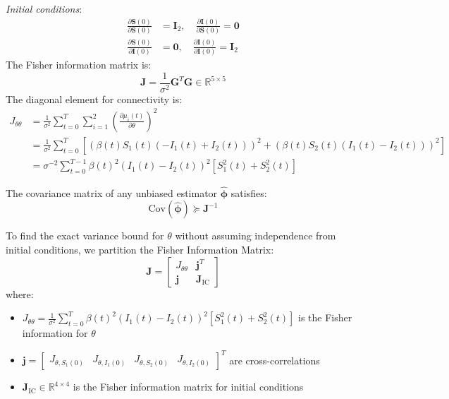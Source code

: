 \emph{Initial conditions}:
\begin{align}
\frac{\partial \mathbf{S}(0)}{\partial \mathbf{S}(0)} &= \mathbf{I}_2, \quad \frac{\partial \mathbf{I}(0)}{\partial \mathbf{S}(0)} = \mathbf{0} \\
\frac{\partial \mathbf{S}(0)}{\partial \mathbf{I}(0)} &= \mathbf{0}, \quad \frac{\partial \mathbf{I}(0)}{\partial \mathbf{I}(0)} = \mathbf{I}_2
\end{align}
The Fisher information matrix is:
\begin{equation}
\mathbf{J} = \frac{1}{\sigma^2} \mathbf{G}^T \mathbf{G} \in \mathbb{R}^{5 \times 5}
\end{equation}
The diagonal element for connectivity is:
\begin{align}
J_{\theta\theta} &= \frac{1}{\sigma^2} \sum_{t=0}^T \sum_{i=1}^2 \left(\frac{\partial \mu_i(t)}{\partial \theta}\right)^2 \\
&= \frac{1}{\sigma^2} \sum_{t=0}^T \left[ (\beta(t) S_1(t) (-I_1(t) + I_2(t)))^2 + (\beta(t) S_2(t) (I_1(t) - I_2(t)))^2 \right] \\
&= \sigma^{-2} \sum_{t=0}^{T-1} \beta(t)^2 (I_1(t) - I_2(t))^2 \left[ S_1^2(t) + S_2^2(t) \right]
\end{align}

The covariance matrix of any unbiased estimator $\hat{\boldsymbol{\phi}}$ satisfies:
\begin{equation}
\text{Cov}(\hat{\boldsymbol{\phi}}) \succeq \mathbf{J}^{-1}
\end{equation}

To find the exact variance bound for $\theta$ without assuming independence from initial conditions, we partition the Fisher Information Matrix:
\begin{equation}
\mathbf{J} = \begin{bmatrix}
J_{\theta\theta} & \mathbf{j}^T \\
\mathbf{j} & \mathbf{J}_{\text{IC}}
\end{bmatrix}
\end{equation}
where:
\begin{itemize}
\item $J_{\theta\theta} = \frac{1}{\sigma^2} \sum_{t=0}^T \beta(t)^2 (I_1(t) - I_2(t))^2 [ S_1^2(t) + S_2^2(t) ]$ is the Fisher information for $\theta$
\item $\mathbf{j} = \begin{bmatrix} J_{\theta,S_1(0)} & J_{\theta,I_1(0)} & J_{\theta,S_2(0)} & J_{\theta,I_2(0)} \end{bmatrix}^T$ are cross-correlations
\item $\mathbf{J}_{\text{IC}} \in \mathbb{R}^{4 \times 4}$ is the Fisher information matrix for initial conditions
\end{itemize}

